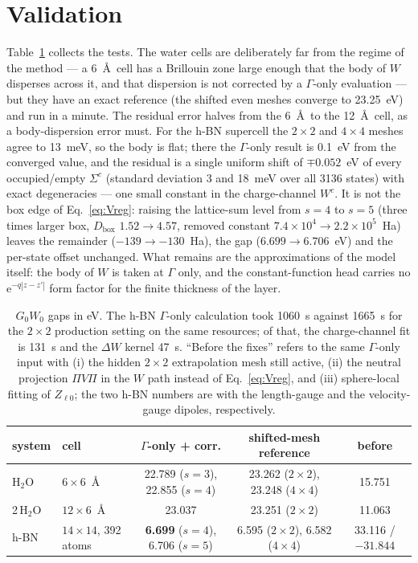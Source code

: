 \documentclass[11pt,a4paper]{article}
\newcommand{\ee}{\mathrm{e}}
\begin{document}
\section{Validation}

Table~\ref{tab:val} collects the tests. The water cells are deliberately far from the regime of
the method --- a 6~\AA\ cell has a Brillouin zone large enough that the body of $W$ disperses
across it, and that dispersion is not corrected by a $\Gamma$-only evaluation --- but they have
an exact reference (the shifted even meshes converge to 23.25~eV) and run in a minute. The
residual error halves from the 6~\AA\ to the 12~\AA\ cell, as a body-dispersion error must. For
the h-BN supercell the $2\times2$ and $4\times4$ meshes agree to 13~meV, so the body is flat;
there the $\Gamma$-only result is 0.1~eV from the converged value, and the residual is a single
uniform shift of $\mp0.052$~eV of every occupied/empty $\Sigma^c$ (standard deviation 3 and
18~meV over all 3136 states) with exact degeneracies --- one small constant in the charge-channel
$W^c$. It is not the box edge of Eq.~\eqref{eq:Vreg}: raising the lattice-sum level from
$s=4$ to $s=5$ (three times larger box, $D_\mathrm{box}$ $1.52\to4.57$, removed constant
$7.4\times10^4\to2.2\times10^5$~Ha) leaves the remainder ($-139\to-130$~Ha), the gap
($6.699\to6.706$~eV) and the per-state offset unchanged. What remains are the approximations
of the model itself: the body of $W$ is taken at $\Gamma$ only, and the constant-function head
carries no $\ee^{-q|z-z'|}$ form factor for the finite thickness of the layer.

\begin{table}[h]
\centering
\footnotesize
\setlength{\tabcolsep}{4pt}
\begin{tabular}{llccc}
\toprule
system & cell & $\Gamma$-only + corr. & shifted-mesh reference & before\\
\midrule
H$_2$O & $6\times6$~\AA & 22.789 ($s{=}3$), 22.855 ($s{=}4$) & 23.262 ($2{\times}2$), 23.248 ($4{\times}4$) & 15.751\\
2\,H$_2$O & $12\times6$~\AA & 23.037 & 23.251 ($2{\times}2$) & 11.063\\
h-BN & $14\times14$, 392 atoms & \textbf{6.699} ($s{=}4$), 6.706 ($s{=}5$) & 6.595 ($2{\times}2$), 6.582 ($4{\times}4$) & 33.116 / $-31.844$\\
\bottomrule
\end{tabular}
\caption{$G_0W_0$ gaps in eV. The h-BN $\Gamma$-only calculation took 1060~s against 1665~s for
the $2\times2$ production setting on the same resources; of that, the charge-channel fit is
131~s and the $\Delta W$ kernel 47~s. ``Before the fixes'' refers to the same $\Gamma$-only
input with (i) the hidden $2\times2$ extrapolation mesh still active, (ii) the neutral
projection $\Pi V\Pi$ in the $W$ path instead of Eq.~\eqref{eq:Vreg}, and (iii) sphere-local
fitting of $Z_{\ell0}$; the two h-BN numbers are with the length-gauge and the velocity-gauge
dipoles, respectively.}
\label{tab:val}
\end{table}
\end{document}
